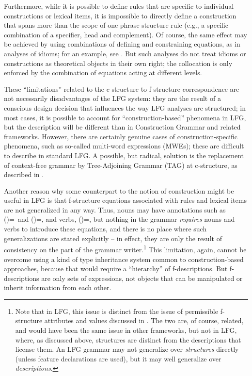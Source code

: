 \documentclass[output=paper,hidelinks]{langscibook}
\begin{document}
 Furthermore, while it is possible to define rules that are specific to individual constructions or lexical items, it is impossible to directly define a construction that spans more than the scope of one phrase structure rule (e.g., a specific combination of a specifier, head and complement). Of course, the same effect may be achieved by using combinations of defining and constraining equations, as in analyses of idioms; for an example, see \textcite[77]{falk2001lexical}. But such analyses do not treat idioms or constructions as theoretical objects in their own right; the collocation is only enforced by the combination of equations acting at different levels.
  
 These ``limitations'' related to the c-structure to f-structure correspondence are not necessarily disadvantages of the LFG system: they are the result of a conscious design decision that influences the way LFG analyses are structured; in most cases, it is possible to account for ``construction-based'' phenomena in LFG, but the description will be different than in Construction Grammar and related frameworks. However, there are certainly genuine cases of construction-specific phenomena, such as so-called multi-word expressions (MWEs); these are difficult to describe in standard LFG. A possible, but radical, solution is the replacement of context-free grammar by Tree-Adjoining Grammar (TAG) at c-structure, as described in .
 
 Another reason why some counterpart to the notion of construction might be useful in LFG is that f-structure equations associated with rules and lexical items are not generalized in any way. Thus, nouns may have annotations such as (\UP\NUM)=\SG\  and (\UP\NUM)=\PL, and verbs, (\UP\TENSE)=\PST, but nothing in the grammar \textit{requires} nouns and verbs to introduce these equations, and there is no place where such generalizations are stated explicitly -- in effect, they are only the result of consistency on the part of the grammar writer.\footnote{Note that in LFG, this issue is distinct from the issue of permissible f-structure attributes and values discussed in . The two are, of course, related, and would have been the same issue in other frameworks, but not in LFG, where, as discussed above, structures are distinct from the descriptions that license them. An LFG grammar may not generalize over \textit{structures} directly (unless feature declarations are used), but it may well generalize over \textit{descriptions}.} This limitation, again, cannot be overcome using a kind of type inheritance system common to construction-based approaches, because that would require a ``hierarchy'' of f-descriptions. But f-descriptions are only sets of expressions, not objects that can be manipulated or inherit information from each other.
 
\end{document}
